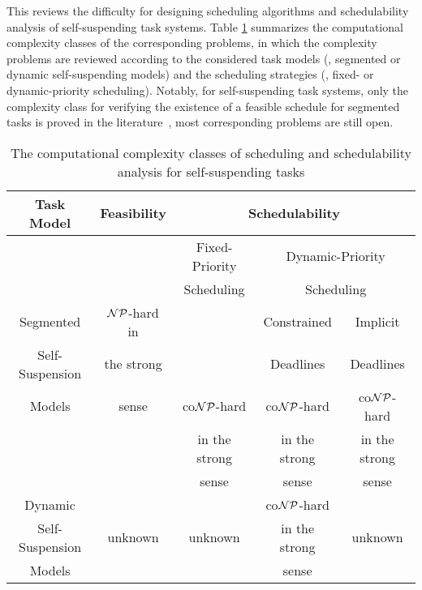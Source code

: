 \label{sec:hardness}
This \mysectionrefnormal{} reviews the difficulty for designing scheduling algorithms and schedulability analysis of self-suspending task systems. Table \ref{table:complexity} summarizes the computational complexity classes of the corresponding problems, in which the complexity problems are reviewed according to the considered task models (\ie, segmented or dynamic self-suspending models) and the scheduling strategies (\ie, fixed- or dynamic-priority scheduling). Notably, for self-suspending task systems, only the complexity class for verifying the existence of a feasible schedule for segmented tasks is proved in the literature~\cite{Ric03,Ridouard_2004}, most corresponding problems are still open.

\begin{table}[t]
\centering
    \begin{tabular}{|c|c|c|c|c|}
 \hline
        Task Model & Feasibility & \multicolumn{3}{c|}{Schedulability} \\
        \hline
        &  & Fixed-Priority & \multicolumn{2}{c|}{Dynamic-Priority}\\
        &  & Scheduling     & \multicolumn{2}{c|}{Scheduling}\\
        \cline{3-5}    
        Segmented & ${\cal NP}$-hard in &  & Constrained & Implicit\\
         Self-Suspension  & the strong &   & Deadlines   & Deadlines \\
        \cline{4-5}
        Models & sense \cite{Ric03,Ridouard_2004} & co${\cal NP}$-hard& co${\cal NP}$-hard & co${\cal NP}$-hard \\
        &  & in the strong & in the strong & in the strong\\
        & & sense \cite{DBLP:conf/rtns/MohaqeqiE016,RTSS2016-suspension}& sense \cite{RTSS2016-suspension}& sense \cite{RTSS2016-suspension}\\
        \hline
        Dynamic & \multirow{3}{*}{unknown} & & co${\cal NP}$-hard & \multirow{3}{*}{unknown}\\
         Self-Suspension & & unknown &in the strong& \\
        Models & & & sense \cite{RTSS2016-suspension}& \\
        \hline
    \end{tabular}
    \vskip 0.2in
    \caption{The computational complexity classes of scheduling and schedulability analysis for self-suspending tasks}
    \label{table:complexity}
\end{table}

